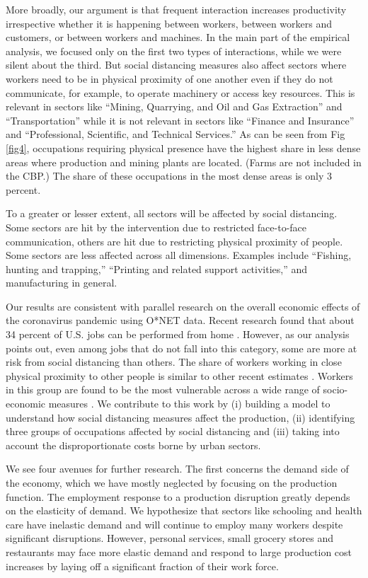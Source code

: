 More broadly, our argument is that frequent interaction increases productivity irrespective whether it is happening between workers, between workers and customers, or between workers and machines. In the main part of the empirical analysis, we focused only on the first two types of interactions, while we were silent about the third. But social distancing measures also affect sectors where workers need to be in physical proximity of one another even if they do not communicate, for example, to operate machinery or access key resources. This is relevant in sectors like ``Mining, Quarrying, and Oil and Gas Extraction'' and ``Transportation'' while it is not relevant in sectors like ``Finance and Insurance'' and ``Professional, Scientific, and Technical Services.'' As can be seen from Fig \ref{fig4}, occupations requiring physical presence have the highest share in less dense areas where production and mining plants are located. (Farms are not included in the CBP.) The share of these occupations in the most dense areas is only 3 percent.

To a greater or lesser extent, all sectors will be affected by social distancing. Some sectors are hit by the intervention due to restricted face-to-face communication, others are hit due to restricting physical proximity of people. Some sectors are less affected across all dimensions. Examples include ``Fishing, hunting and trapping,'' ``Printing and related support activities,'' and manufacturing in general. 

Our results are consistent with parallel research on the overall economic effects of the coronavirus pandemic using O*NET data. Recent research found that about 34 percent of U.S. jobs can be performed from home \cite{Dingel2020-lh}. However, as our analysis points out, even among jobs that do not fall into this category, some are more at risk from social distancing than others. The share of workers working in close physical proximity to other people is similar to other recent estimates \cite{Leibovici2020-qr}. Workers in this group are found to be the most vulnerable across a wide range of socio-economic measures \cite{Jin2020-tq,Mongey2020-qc}. We contribute to this work by (i) building a model to understand how social distancing measures affect the production, (ii) identifying three groups of occupations affected by social distancing and (iii) taking into account the disproportionate costs borne by urban sectors.

We see four avenues for further research. The first concerns the demand side of the economy, which we have mostly neglected by focusing on the production function. The employment response to a production disruption greatly depends on the elasticity of demand. We hypothesize that sectors like schooling and health care have inelastic demand and will continue to employ many workers despite significant disruptions. However, personal services, small grocery stores and restaurants may face more elastic demand and respond to large production cost increases by laying off a significant fraction of their work force.

